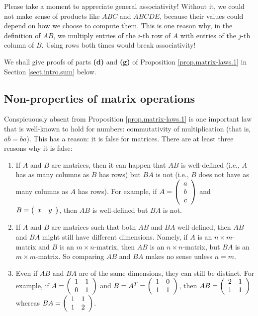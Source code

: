 \documentclass[numbers=enddot,12pt,final,onecolumn,notitlepage]{scrartcl}%
\theoremstyle{definition}
\begin{document}
Please take a moment to appreciate general associativity! Without it, we could
not make sense of products like $ABC$ and $ABCDE$, because their values could
depend on how we choose to compute them. This is one reason why, in the
definition of $AB$, we multiply entries of the $i$-th row of $A$ with entries
of the $j$-th column of $B$. Using rows both times would break associativity!

We shall give proofs of parts \textbf{(d)} and \textbf{(g)} of Proposition
\ref{prop.matrix-laws.1} in Section \ref{sect.intro.sum} below.

\subsection{Non-properties of matrix operations}

Conspicuously absent from Proposition \ref{prop.matrix-laws.1} is one
important law that is well-known to hold for numbers: commutativity of
multiplication (that is, $ab=ba$). This has a reason: it is false for
matrices. There are at least three reasons why it is false:

\begin{enumerate}
\item If $A$ and $B$ are matrices, then it can happen that $AB$ is
well-defined (i.e., $A$ has as many columns as $B$ has rows) but $BA$ is not
(i.e., $B$ does not have as many columns as $A$ has rows). For example, if
$A=\left(
\begin{array}
[c]{c}%
a\\
b\\
c
\end{array}
\right)  $ and $B=\left(
\begin{array}
[c]{cc}%
x & y
\end{array}
\right)  $, then $AB$ is well-defined but $BA$ is not.

\item If $A$ and $B$ are matrices such that both $AB$ and $BA$ well-defined,
then $AB$ and $BA$ might still have different dimensions. Namely, if $A$ is an
$n\times m$-matrix and $B$ is an $m\times n$-matrix, then $AB$ is an $n\times
n$-matrix, but $BA$ is an $m\times m$-matrix. So comparing $AB$ and $BA$ makes
no sense unless $n=m$.

\item Even if $AB$ and $BA$ are of the same dimensions, they can still be
distinct. For example, if $A=\left(
\begin{array}
[c]{cc}%
1 & 1\\
0 & 1
\end{array}
\right)  $ and $B=A^{T}=\left(
\begin{array}
[c]{cc}%
1 & 0\\
1 & 1
\end{array}
\right)  $, then $AB=\left(
\begin{array}
[c]{cc}%
2 & 1\\
1 & 1
\end{array}
\right)  $ whereas $BA=\left(
\begin{array}
[c]{cc}%
1 & 1\\
1 & 2
\end{array}
\right)  $.
\end{enumerate}
\end{document}
